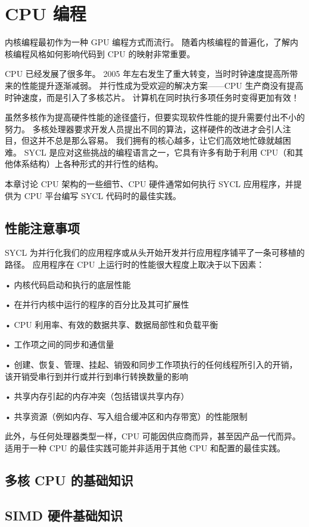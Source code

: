 \section{CPU 编程}
内核编程最初作为一种 GPU 编程方式而流行。 随着内核编程的普遍化，了解内核编程风格如何影响代码到 CPU 的映射非常重要。

CPU 已经发展了很多年。 2005 年左右发生了重大转变，当时时钟速度提高所带来的性能提升逐渐减弱。 并行性成为受欢迎的解决方案——CPU 生产商没有提高时钟速度，而是引入了多核芯片。 计算机在同时执行多项任务时变得更加有效！

虽然多核作为提高硬件性能的途径盛行，但要实现软件性能的提升需要付出不小的努力。 多核处理器要求开发人员提出不同的算法，这样硬件的改进才会引人注目，但这并不总是那么容易。 我们拥有的核心越多，让它们高效地忙碌就越困难。 SYCL 是应对这些挑战的编程语言之一，它具有许多有助于利用 CPU（和其他体系结构）上各种形式的并行性的结构。

本章讨论 CPU 架构的一些细节、CPU 硬件通常如何执行 SYCL 应用程序，并提供为 CPU 平台编写 SYCL 代码时的最佳实践。

\subsection{性能注意事项}
SYCL 为并行化我们的应用程序或从头开始开发并行应用程序铺平了一条可移植的路径。 应用程序在 CPU 上运行时的性能很大程度上取决于以下因素：

• 内核代码启动和执行的底层性能

• 在并行内核中运行的程序的百分比及其可扩展性

• CPU 利用率、有效的数据共享、数据局部性和负载平衡

• 工作项之间的同步和通信量

• 创建、恢复、管理、挂起、销毁和同步工作项执行的任何线程所引入的开销，该开销受串行到并行或并行到串行转换数量的影响

• 共享内存引起的内存冲突（包括错误共享内存）

• 共享资源（例如内存、写入组合缓冲区和内存带宽）的性能限制

此外，与任何处理器类型一样，CPU 可能因供应商而异，甚至因产品一代而异。 适用于一种 CPU 的最佳实践可能并非适用于其他 CPU 和配置的最佳实践。

\subsection{多核 CPU 的基础知识}

\subsection{SIMD 硬件基础知识}


